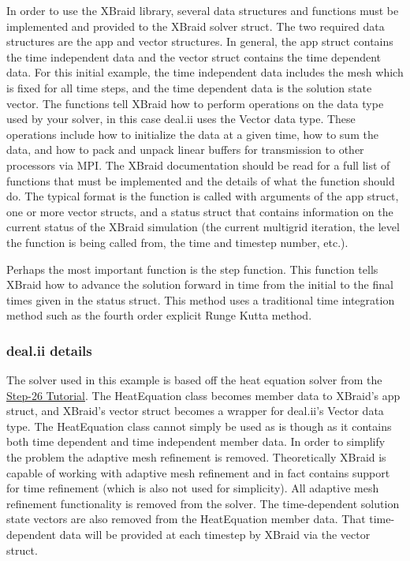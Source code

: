 \documentclass{article}
\begin{document}
In order to use the XBraid library, several data structures and
functions must be implemented and provided to the XBraid solver struct.
The two required data structures are the app and vector structures. In
general, the app struct contains the time independent data and the
vector struct contains the time dependent data. For this initial
example, the time independent data includes the mesh which is fixed for
all time steps, and the time dependent data is the solution state
vector. The functions tell XBraid how to perform operations on the data
type used by your solver, in this case deal.ii uses the Vector data
type. These operations include how to initialize the data at a given
time, how to sum the data, and how to pack and unpack linear buffers for
transmission to other processors via MPI. The XBraid documentation
should be read for a full list of functions that must be implemented and
the details of what the function should do. The typical format is the
function is called with arguments of the app struct, one or more vector
structs, and a status struct that contains information on the current
status of the XBraid simulation (the current multigrid iteration, the
level the function is being called from, the time and timestep number,
etc.).

Perhaps the most important function is the step function. This function
tells XBraid how to advance the solution forward in time from the
initial to the final times given in the status struct. This method uses
a traditional time integration method such as the fourth order explicit
Runge Kutta method.

\subsubsection{deal.ii details}\label{deal.ii-details}

The solver used in this example is based off the heat equation solver
from the
\href{https://dealii.org/developer/doxygen/deal.II/step\_26.html}{Step-26 Tutorial}.
The HeatEquation class becomes member data to XBraid's app struct, and
XBraid's vector struct becomes a wrapper for deal.ii's Vector data type.
The HeatEquation class cannot simply be used as is though as it contains
both time dependent and time independent member data. In order to
simplify the problem the adaptive mesh refinement is removed.
Theoretically XBraid is capable of working with adaptive mesh refinement
and in fact contains support for time refinement (which is also not used
for simplicity). All adaptive mesh refinement functionality is removed
from the solver. The time-dependent solution state vectors are also
removed from the HeatEquation member data. That time-dependent data will
be provided at each timestep by XBraid via the vector struct.
\end{document}
